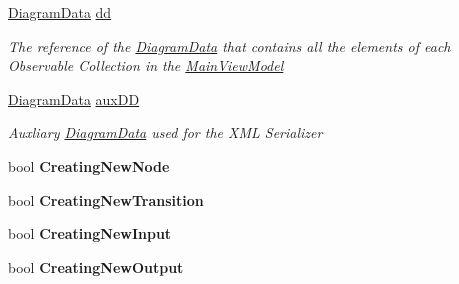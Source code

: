 \begin{DoxyCompactItemize}
\item 
\hyperlink{class_prototipo_t_f_g_1_1_diagram_data}{Diagram\+Data} \hyperlink{class_prototipo_t_f_g_1_1_main_view_model_a648a8ec23b44d0e05f6d265710d07432}{dd}
\begin{DoxyCompactList}\small\item\em The reference of the \hyperlink{class_prototipo_t_f_g_1_1_diagram_data}{Diagram\+Data} that contains all the elements of each Observable Collection in the \hyperlink{class_prototipo_t_f_g_1_1_main_view_model}{Main\+View\+Model} \end{DoxyCompactList}\item 
\hyperlink{class_prototipo_t_f_g_1_1_diagram_data}{Diagram\+Data} \hyperlink{class_prototipo_t_f_g_1_1_main_view_model_af16d48151e02d562bcb956b5910b3d56}{aux\+D\+D}
\begin{DoxyCompactList}\small\item\em Auxliary \hyperlink{class_prototipo_t_f_g_1_1_diagram_data}{Diagram\+Data} used for the X\+M\+L Serializer \end{DoxyCompactList}\item 
\hypertarget{class_prototipo_t_f_g_1_1_main_view_model_a1e59715322871187a78abe15bb48f968}{}bool {\bfseries Creating\+New\+Node}\label{class_prototipo_t_f_g_1_1_main_view_model_a1e59715322871187a78abe15bb48f968}

\item 
\hypertarget{class_prototipo_t_f_g_1_1_main_view_model_aa38c9a7de7abc91ab40788c6c1689645}{}bool {\bfseries Creating\+New\+Transition}\label{class_prototipo_t_f_g_1_1_main_view_model_aa38c9a7de7abc91ab40788c6c1689645}

\item 
\hypertarget{class_prototipo_t_f_g_1_1_main_view_model_aad988448ad92293658c5469f7b8b89a2}{}bool {\bfseries Creating\+New\+Input}\label{class_prototipo_t_f_g_1_1_main_view_model_aad988448ad92293658c5469f7b8b89a2}

\item 
\hypertarget{class_prototipo_t_f_g_1_1_main_view_model_ad3be53cd2573418905f569bed4ab6ac3}{}bool {\bfseries Creating\+New\+Output}\label{class_prototipo_t_f_g_1_1_main_view_model_ad3be53cd2573418905f569bed4ab6ac3}


\end{DoxyCompactItemize}
